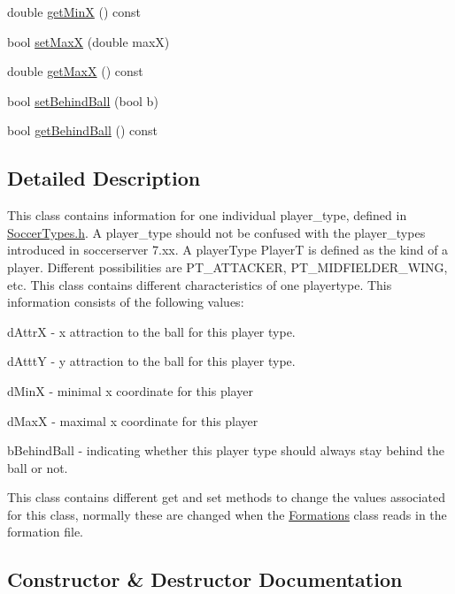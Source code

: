 \begin{DoxyCompactItemize}
\item 
double \hyperlink{classPlayerTypeInfo_a4e41aec6608daf66e873ba752752f22b}{get\+MinX} () const 
\item 
bool \hyperlink{classPlayerTypeInfo_a7c8d5fbad4617e6826601f31d51208e7}{set\+MaxX} (double maxX)
\item 
double \hyperlink{classPlayerTypeInfo_a87678225690b505d875c8f5646653290}{get\+MaxX} () const 
\item 
bool \hyperlink{classPlayerTypeInfo_a1aec6f8f9eb375c60dcede391efda067}{set\+Behind\+Ball} (bool b)
\item 
bool \hyperlink{classPlayerTypeInfo_a7faf19a8b63a2ca282dc14b8edcddd54}{get\+Behind\+Ball} () const 
\end{DoxyCompactItemize}


\subsection{Detailed Description}
This class contains information for one individual player\+\_\+type, defined in \hyperlink{SoccerTypes_8h}{Soccer\+Types.\+h}. A player\+\_\+type should not be confused with the player\+\_\+types introduced in soccerserver 7.\+xx. A player\+Type PlayerT is defined as the kind of a player. Different possibilities are P\+T\+\_\+\+A\+T\+T\+A\+C\+K\+ER, P\+T\+\_\+\+M\+I\+D\+F\+I\+E\+L\+D\+E\+R\+\_\+\+W\+I\+NG, etc. This class contains different characteristics of one playertype. This information consists of the following values\+:
\begin{DoxyItemize}
\item d\+AttrX -\/ x attraction to the ball for this player type.
\item d\+AtttY -\/ y attraction to the ball for this player type.
\item d\+MinX -\/ minimal x coordinate for this player
\item d\+MaxX -\/ maximal x coordinate for this player
\item b\+Behind\+Ball -\/ indicating whether this player type should always stay behind the ball or not.
\end{DoxyItemize}

This class contains different get and set methods to change the values associated for this class, normally these are changed when the \hyperlink{classFormations}{Formations} class reads in the formation file. 

\subsection{Constructor \& Destructor Documentation}
